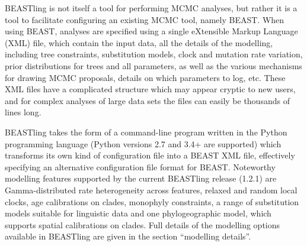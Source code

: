 \documentclass[10pt,a4paper]{article}
\begin{document}
BEASTling is not itself a tool for performing MCMC analyses, but rather it is a tool to facilitate configuring an existing MCMC tool, namely BEAST.  When using BEAST, analyses are specified using a single eXtensible Markup Language (XML) file, which contain the input data, all the details of the modelling, including tree constraints, substitution models, clock and mutation rate variation, prior distributions for trees and all parameters, as well as the various mechanisms for drawing MCMC proposals, details on which parameters to log, etc.  These XML files have a complicated structure which may appear cryptic to new users, and for complex analyses of large data sets the files can easily be thousands of lines long.

BEASTling takes the form of a command-line program written in the Python programming language (Python versions 2.7 and 3.4+ are supported) which transforms its own kind of configuration file into a BEAST XML file, effectively specifying an alternative configuration file format for BEAST. Noteworthy modelling features supported by the current BEASTling release (1.2.1) are Gamma-distributed rate heterogeneity across features, relaxed and random local clocks, age calibrations on clades, monophyly constraints, a range of substitution models suitable for linguistic data and one phylogeographic model, which supports spatial calibrations on clades.  Full details of the modelling options available in BEASTling are given in the section ``modelling details''.
\end{document}
